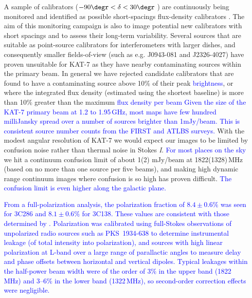 \noindent
A sample of calibrators ($-90\degr<\delta<30\degr$ ) are continuously
being monitored and identified as possible short-spacings flux-density
calibrators \citep{kassaye}. The aim of this monitoring campaign is
also to image potential new calibrators with short spacings and to
assess their long-term variability. Several sources that are suitable
as point-source calibrators for interferometers with larger dishes,
and consequently smaller fields-of-view (such as e.g. \mbox{J0943-081}
and \mbox{J2326-4027}) have proven unsuitable for KAT-7 as they have
nearby contaminating sources within the primary beam.
In general we have rejected candidate calibrators that are found to
have a contaminating source above 10\% of their peak
\textcolor{blue}{brightness}, or where the integrated flux density
(estimated using the shortest baseline) is more than 10\% greater than
the maximum \textcolor{blue}{flux density per beam}
%
 \textcolor{blue}{Given the size of the KAT-7 primary beam at
  1.2 to 1.95\,GHz, most maps have few hundred milliJansky spread over a
  number of sources brighter than 1mJy/beam. This is consistent source
  number counts from the FIRST \citep{white} and  ATLBS \citep{sub} surveys.}  With the modest
angular resolution of KAT-7 we would expect our images to be limited
by confusion noise rather than thermal noise in Stokes
\emph{I}. \textcolor{blue}{For most places on the sky} we hit a
continuum confusion limit of about 1(2) mJy/beam at 1822(1328)\,MHz
(based on no more than one source per five beams), and making high
dynamic range continuum images where confusion is so high has proven
difficult. \textcolor{blue}{The confusion limit is even higher along
  the galactic plane.}

\textcolor{blue}{ From a full-polarization analysis, the polarization
  fraction of $8.4\pm0.6 \%$ was seen for 3C286 and $8.1\pm0.6 \%$ for
  3C138. These values are consistent with those determined by
  \citet{perley}.  Polarization was calibrated using full-Stokes
  observations of unpolarized radio sources such as \mbox{PKS
    1934-638} to determine instrumental leakage (of total intensity
  into polarization), and sources with high linear polarization at
  L-band over a large range of parallactic angles to measure delay and
  phase offsets between horizontal and vertical dipoles.  Typical
  leakages within the half-power beam width were of the order of 3\%
  in the upper band (1822\,MHz) and 3--6\% in the lower band
  (1322\,MHz), so second-order correction effects were negligible.}

